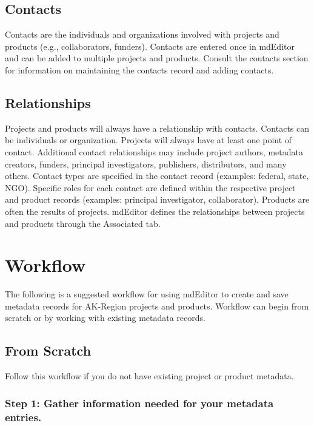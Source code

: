 \documentclass[
]{book}
\begin{document}
\hypertarget{contacts}{%
\section{Contacts}\label{contacts}}

Contacts are the individuals and organizations involved with projects and products (e.g., collaborators, funders). Contacts are entered once in mdEditor and can be added to multiple projects and products.
Consult the contacts section for information on maintaining the contacts record and adding contacts.

\hypertarget{relationships}{%
\section{Relationships}\label{relationships}}

Projects and products will always have a relationship with contacts. Contacts can be individuals or organization. Projects will always have at least one point of contact. Additional contact relationships may include project authors, metadata creators, funders, principal investigators, publishers, distributors, and many others.
Contact types are specified in the contact record (examples: federal, state, NGO). Specific roles for each contact are defined within the respective project and product records (examples: principal investigator, collaborator).
Products are often the results of projects. mdEditor defines the relationships between projects and products through the Associated tab.

\hypertarget{workflow}{%
\chapter{Workflow}\label{workflow}}

The following is a suggested workflow for using mdEditor to create and save metadata records for AK-Region projects and products. Workflow can begin from scratch or by working with existing metadata records.

\hypertarget{from-scratch}{%
\section{From Scratch}\label{from-scratch}}

Follow this workflow if you do not have existing project or product metadata.

\hypertarget{step-1-gather-information-needed-for-your-metadata-entries.}{%
\subsection{Step 1: Gather information needed for your metadata entries.}\label{step-1-gather-information-needed-for-your-metadata-entries.}}
\end{document}
